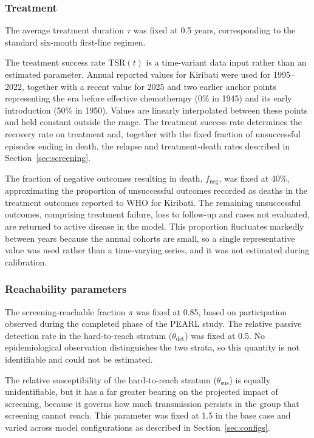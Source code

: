 \subsubsection{Treatment}

The average treatment duration \(\tau\) was fixed at 0.5 years, corresponding to the standard six-month first-line regimen.

The treatment success rate \(\mathrm{TSR}(t)\) is a time-variant data input rather than an estimated parameter. Annual reported values for Kiribati were used for 1995--2022, together with a recent value for 2025 and two earlier anchor points representing the era before effective chemotherapy (0\% in 1945) and its early introduction (50\% in 1950). Values are linearly interpolated between these points and held constant outside the range. The treatment success rate determines the recovery rate on treatment and, together with the fixed fraction of unsuccessful episodes ending in death, the relapse and treatment-death rates described in Section~\ref{sec:screening}.

The fraction of negative outcomes resulting in death, \(f_{\mathrm{neg}}\), was fixed at 40\%, approximating the proportion of unsuccessful outcomes recorded as deaths in the treatment outcomes reported to WHO for Kiribati. The remaining unsuccessful outcomes, comprising treatment failure, loss to follow-up and cases not evaluated, are returned to active disease in the model. This proportion fluctuates markedly between years because the annual cohorts are small, so a single representative value was used rather than a time-varying series, and it was not estimated during calibration.

\subsubsection{Reachability parameters}

The screening-reachable fraction \(\pi\) was fixed at 0.85, based on participation observed during the completed phase of the PEARL study. The relative passive detection rate in the hard-to-reach stratum (\(\theta_{\mathrm{det}}\)) was fixed at 0.5. No epidemiological observation distinguishes the two strata, so this quantity is not identifiable and could not be estimated.

The relative susceptibility of the hard-to-reach stratum (\(\theta_{\mathrm{sus}}\)) is equally unidentifiable, but it has a far greater bearing on the projected impact of screening, because it governs how much transmission persists in the group that screening cannot reach. This parameter was fixed at 1.5 in the base case and varied across model configurations as described in Section~\ref{sec:configs}.

